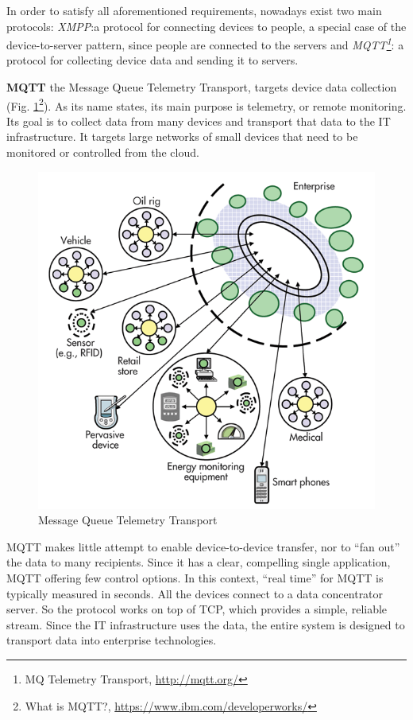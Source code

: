       In order to satisfy all aforementioned requirements, nowadays exist two main protocols: \emph{XMPP\cite{XMPPbook}}:a protocol for connecting devices to people, a special case of the device-to-server pattern, since people are connected to the servers and \emph{MQTT\footnote{MQ Telemetry Transport, \url{http://mqtt.org/}}}: a protocol for collecting device data and sending it to servers. 

      \textbf{MQTT}
      \newline
      the Message Queue Telemetry Transport, targets device data collection (Fig. \ref{img:MQTT}\footnote{What is MQTT?, \url{https://www.ibm.com/developerworks/}}). As its name states, its main purpose is telemetry, or remote monitoring. Its goal is to collect data from many devices and transport that data to the IT infrastructure. It targets large networks of small devices that need to be monitored or controlled from the cloud.
      \begin{figure}[!ht]
      \centering
      \includegraphics[scale=0.6]{images/MQTT.png}   
      \caption[Message Queue Telemetry Transport]{Message Queue Telemetry Transport}
      \label{img:MQTT}                           
      \end{figure}
      MQTT makes little attempt to enable device-to-device transfer, nor to ``fan out'' the data to many recipients. Since it has a clear, compelling single application, MQTT offering few control options. In this context, ``real time'' for MQTT is typically measured in seconds. All the devices connect to a data concentrator server. So the protocol works on top of TCP, which provides a simple, reliable stream. Since the IT infrastructure uses the data, the entire system is designed to transport data into enterprise technologies.

